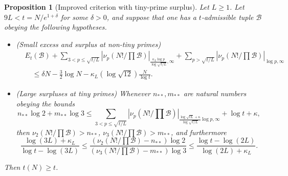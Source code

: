 \documentclass[12pt,a4paper,reqno]{amsart}
\numberwithin{equation}{section}
\theoremstyle{plain}
\newtheorem{proposition}[theorem]{Proposition}
\theoremstyle{definition}
\newcommand\tuple{{\mathcal B}}
\begin{document}
\begin{proposition}[Improved criterion with tiny-prime surplus]\label{balance-23'}  Let $L \geq 1$.
  Let $9L < t = N/e^{1+\delta}$ for some $\delta>0$, and suppose that one has a $t$-admissible tuple $\tuple$ obeying the following hypotheses.
\begin{itemize}
\item[(i)] (Small excess and surplus at non-tiny primes)
\begin{equation}\label{new-balance-4}
  \begin{split}
&      E_t(\tuple) + \sum_{3 < p \leq \sqrt{t/L}}
 |\nu_p(N!/\prod \tuple)|_{\frac{\kappa_L \log p}{\log \sqrt{t/L}},\infty} + 
 \sum_{p>\sqrt{t/L}} |\nu_p(N!/\prod \tuple)|_{\log p,\infty}\\
&\quad    \leq \delta N - \frac{3}{2} \log N - \kappa_L (\log \sqrt{12}) \frac{N}{\log t}.
  \end{split}
 \end{equation}
 \item[(ii)] (Large surpluses at tiny primes) Whenever $n_{**}, m_{**}$ are natural numbers obeying the  bounds
 $$ n_{**} \log 2 + m_{**} \log 3 \leq 
 \sum_{3 < p \leq \sqrt{t/L}}
 |\nu_p(N!/\prod \tuple)|_{\frac{\log \sqrt{tL} + \kappa}{\log\sqrt{t/L}} \log p,\infty}
 + \log t + \kappa,$$
 then $\nu_2(N!/\prod \tuple) > n_{**}$, $\nu_3(N!/\prod \tuple) > m_{**}$, and furthermore
 $$
 \frac{\log(3L)+\kappa_L}{\log t - \log(3L)} \leq \frac{(\nu_2(N!/\prod \tuple)-n_{**}) \log 2}{(\nu_3(N!/\prod \tuple)-m_{**}) \log 3} \leq \frac{\log t - \log(2L)}{\log(2L)+\kappa_L}.$$
 \end{itemize}
  Then $t(N) \geq t$.
\end{proposition}
\end{document}
